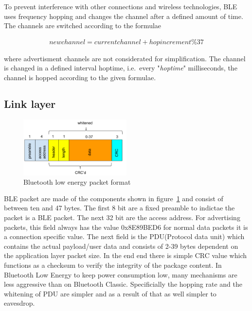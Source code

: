 \documentclass[conference]{IEEEtran}
\begin{document}
To prevent interference with other connections and wireless technologies, BLE uses frequency hopping and changes the channel after a defined amount of time. The channels are switched according to the formulae

\begin{align*}
  newchannel = currentchannel+hopincrement\%37
\end{align*}

where advertisment channels are not considerated for simplification. The channel is changed in a defined interval hoptime, i.e.\ every "\emph{hoptime}" milliseconds, the channel is hopped according to the given formulae.

\subsection{Link layer} \label{ssec:link}

\begin{figure}
  \centering
    \includegraphics[width=0.5\textwidth]{blepacketformat}
    \caption{Bluetooth low energy packet format \cite{imgsrc:packetformat} }
  \label{fig:packetformat}
\end{figure}

BLE packet are made of the components shown in figure~\ref{fig:packetformat} and consist of between ten and 47 bytes. The first 8 bit are a fixed preamble to indictae the packet is a BLE packet. The next 32 bit are the access address. For advertising packets, this field always has the value 0x8E89BED6 for normal data packets it is a connection specific value. The next field is the PDU(Protocol data unit) which contains the actual payload/user data and consists of 2-39 bytes dependent on the application layer packet size. In the end end there is simple CRC value which functions as a checksum to verify the integrity of the package content.
In Bluetooth Low Energy to keep power consumption low, many mechanisms are less aggressive than on Bluetooth Classic. Specificially the hopping rate and the whitening of PDU are simpler and as a result of that as well simpler to eavesdrop.
\end{document}
